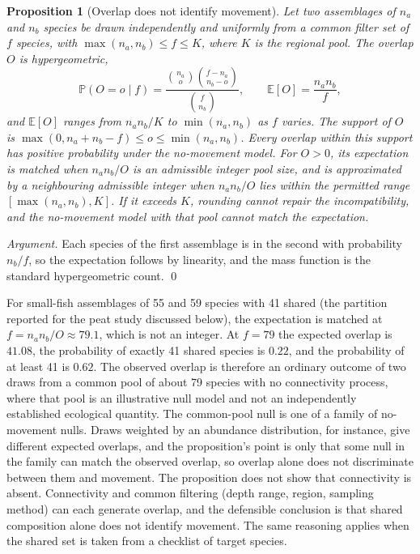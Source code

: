 \documentclass[11pt]{article}
\newtheorem{proposition}{Proposition}
\theoremstyle{definition}
\theoremstyle{remark}
\newcommand{\Ex}{\mathbb{E}}
\renewcommand{\Pr}{\mathbb{P}}
\begin{document}
\begin{proposition}[Overlap does not identify movement]\label{prop:overlap}
Let two assemblages of $n_a$ and $n_b$ species be drawn independently and uniformly from a common filter set of $f$ species, with $\max(n_a,n_b)\le f\le K$, where $K$ is the regional pool. The overlap $O$ is hypergeometric,
\[
\Pr(O=o\mid f)=\frac{\binom{n_a}{o}\binom{f-n_a}{n_b-o}}{\binom{f}{n_b}},\qquad \Ex[O]=\frac{n_an_b}{f},
\]
and $\Ex[O]$ ranges from $n_an_b/K$ to $\min(n_a,n_b)$ as $f$ varies. The support of $O$ is $\max(0,n_a+n_b-f)\le o\le\min(n_a,n_b)$. Every overlap within this support has positive probability under the no-movement model. For $O>0$, its expectation is matched when $n_an_b/O$ is an admissible integer pool size, and is approximated by a neighbouring admissible integer when $n_an_b/O$ lies within the permitted range $[\max(n_a,n_b),K]$. If it exceeds $K$, rounding cannot repair the incompatibility, and the no-movement model with that pool cannot match the expectation.
\end{proposition}

\emph{Argument.} Each species of the first assemblage is in the second with probability $n_b/f$, so the expectation follows by linearity, and the mass function is the standard hypergeometric count. \qed

For small-fish assemblages of 55 and 59 species with 41 shared (the partition reported for the peat study discussed below), the expectation is matched at $f=n_an_b/O\approx79.1$, which is not an integer. At $f=79$ the expected overlap is $41.08$, the probability of exactly 41 shared species is $0.22$, and the probability of at least 41 is $0.62$. The observed overlap is therefore an ordinary outcome of two draws from a common pool of about 79 species with no connectivity process, where that pool is an illustrative null model and not an independently established ecological quantity. The common-pool null is one of a family of no-movement nulls. Draws weighted by an abundance distribution, for instance, give different expected overlaps, and the proposition's point is only that some null in the family can match the observed overlap, so overlap alone does not discriminate between them and movement. The proposition does not show that connectivity is absent. Connectivity and common filtering (depth range, region, sampling method) can each generate overlap, and the defensible conclusion is that shared composition alone does not identify movement. The same reasoning applies when the shared set is taken from a checklist of target species.
\end{document}
